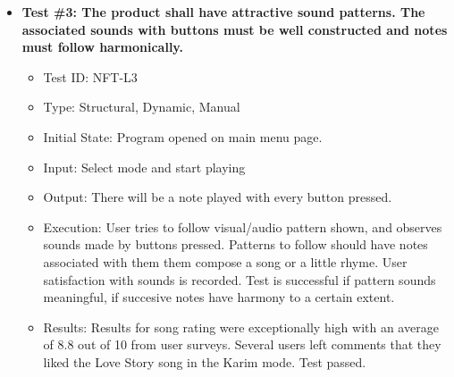 \documentclass[12pt, titlepage]{article}
\begin{document}
\begin{itemize}
\item \textbf{Test \#3: The product shall have attractive sound patterns. The associated sounds with buttons must be well constructed and notes must follow harmonically.}
\begin{itemize}
\item Test ID: NFT-L3
\item Type: Structural, Dynamic, Manual				
\item Initial State: Program opened on main menu page.		
\item Input: Select mode and start playing
\item Output: There will be a note played with every button pressed.	
\item Execution: User tries to follow visual/audio pattern shown, and observes sounds made by buttons pressed. Patterns to follow should have notes associated with them them compose a song or a little rhyme. User satisfaction with sounds is recorded. Test is successful if pattern sounds meaningful, if succesive notes have harmony to a certain extent.
\item Results: Results for song rating were exceptionally high with an average of 8.8 out of 10 from user surveys. Several users left comments that they liked the Love Story song in the Karim mode. Test passed.
\end{itemize}
\end{itemize}
\end{document}
